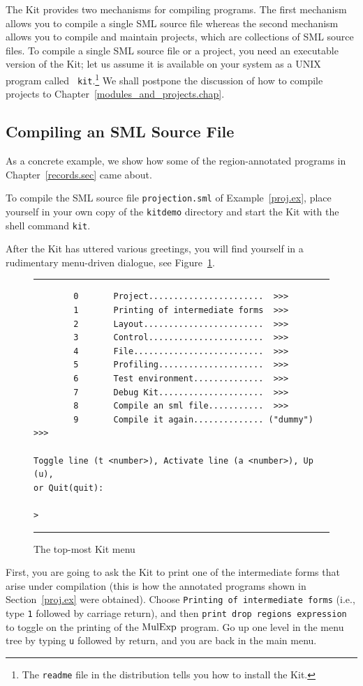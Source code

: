 \documentclass[12pt]{book}
\begin{document}
The Kit provides two mechanisms for compiling programs. The first
mechanism allows you to compile a single SML source file whereas the
second mechanism allows you to compile and maintain projects, which
are collections of SML source files. To compile a single SML source
file or a project, you need an executable version of the Kit; let us
assume it is available on your system as a UNIX program called {\tt
  kit}.\footnote{The {\tt readme} file in the distribution tells you
  how to install the Kit.}  We shall postpone the discussion of how to
compile projects to Chapter~\ref{modules_and_projects.chap}.

\subsection{Compiling an SML Source File}
As a concrete example, we show how some of the region-annotated programs in
Chapter~\ref{records.sec} came about.

To compile the SML source file {\tt projection.sml} of
Example~\ref{proj.ex}, place yourself in your own copy of the {\tt kitdemo} directory
and start the Kit with the shell
command {\tt kit}.

After the Kit has uttered various greetings, you will find yourself in
a rudimentary menu-driven dialogue, see Figure~\ref{dialogue.fig}.
\begin{figure}
\hrule \medskip
\begin{verbatim}
        0       Project.......................  >>>
        1       Printing of intermediate forms  >>>
        2       Layout........................  >>>
        3       Control.......................  >>>
        4       File..........................  >>>
        5       Profiling.....................  >>>
        6       Test environment..............  >>>
        7       Debug Kit.....................  >>>
        8       Compile an sml file...........  >>>
        9       Compile it again.............. ("dummy") >>>

Toggle line (t <number>), Activate line (a <number>), Up (u), 
or Quit(quit): 

>
\end{verbatim}
\caption{The top-most Kit menu}
\medskip \hrule 
\label{dialogue.fig}
\end{figure}
First, you are going to ask the Kit to print one of the intermediate
forms that arise under compilation (this is how the annotated programs
shown in  Section~\ref{proj.ex} were obtained). 
Choose \texttt{Printing of intermediate forms} (i.e., type \texttt{1}
followed by carriage return), and then \texttt{print drop regions
expression} to toggle on the printing of the $\hbox{\rm MulExp}$ program.
Go up one level in the menu tree by typing \texttt{u} followed by return,
and you are back in the main menu.
\end{document}
